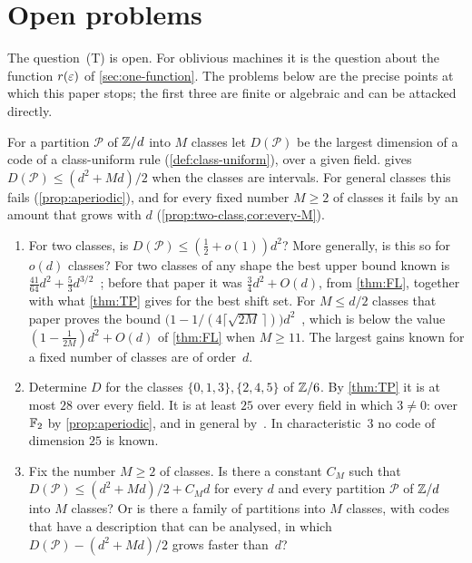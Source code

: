 \section{Open problems}\label{sec:open}

The question~(T) is open. For oblivious machines it is the question about the function $r(\varepsilon)$ of
\cref{sec:one-function}. The problems below are the precise points at which this paper stops; the first three are finite
or algebraic and can be attacked directly.

\begin{problem}\label{prob:aperiodic}
For a partition $\mathcal P$ of $\mathbb{Z}/d$ into $M$ classes let $D(\mathcal P)$ be the largest dimension of a code of a
class-uniform rule (\cref{def:class-uniform}), over a given field.  gives $D(\mathcal P)\le(d^2+Md)/2$ when
the classes are intervals. For general classes this fails (\cref{prop:aperiodic}), and for every fixed number $M\ge2$
of classes it fails by an amount that grows with $d$ (\cref{prop:two-class,cor:every-M}).
\begin{enumerate}[label=(\alph*),leftmargin=2em]
\item For two classes, is $D(\mathcal P)\le(\tfrac12+o(1))d^2$? More generally, is this so for $o(d)$ classes?
For two classes of any shape the best upper bound known is
$\tfrac{41}{64}d^2+\tfrac53d^{3/2}$~\cite[Theorem~3.4]{SharedDecoders2026}; before that paper it was
$\tfrac34d^2+O(d)$, from \cref{thm:FL}, together with what \cref{thm:TP} gives for the best shift set. For $M\le d/2$
classes that paper proves the bound
$\bigl(1-1/(4\lceil\sqrt{2M}\,\rceil)\bigr)d^2$~\cite[Theorem~3.5]{SharedDecoders2026}, which is below the value
$(1-\tfrac1{2M})d^2+O(d)$ of \cref{thm:FL} when $M\ge11$. The largest gains known for a fixed number of
classes are of order~$d$.
\item Determine $D$ for the classes $\{0,1,3\},\{2,4,5\}$ of $\mathbb{Z}/6$. By \cref{thm:TP} it is at most $28$ over every
field. It is at least $25$ over every field in which $3\ne0$: over $\mathbb{F}_2$ by \cref{prop:aperiodic}, and in general
by~\cite[Theorem~3.2]{ClassUniformMemo2026}. In characteristic~$3$ no code of dimension $25$ is known.
\item Fix the number $M\ge2$ of classes. Is there a constant $C_M$ such that $D(\mathcal P)\le(d^2+Md)/2+C_Md$ for
every $d$ and every partition $\mathcal P$ of $\mathbb{Z}/d$ into $M$ classes? Or is there a family of partitions into $M$
classes, with codes that have a description that can be analysed, in which $D(\mathcal P)-(d^2+Md)/2$ grows faster
than~$d$?
\end{enumerate}
\end{problem}

